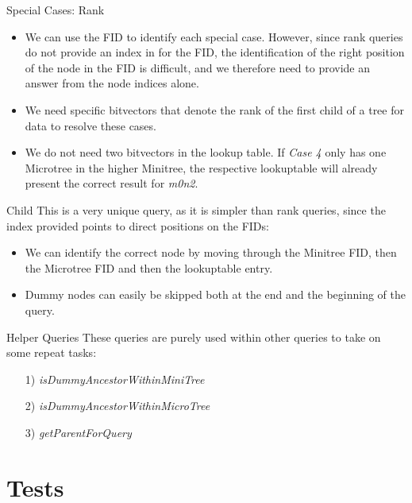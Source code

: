\documentclass{beamer}
\begin{document}
\begin{frame}{Special Cases: Rank}
	\begin{itemize}
	\item
		We can use the FID to identify each special case. However, since rank queries do not provide an index in for the FID, the identification of the right position of the node in the FID is difficult, and we therefore need to provide an answer from the node indices alone.
	\item
		We need specific bitvectors that denote the rank of the first child of a tree for data to resolve these cases.
	\item
		We do not need two bitvectors in the lookup table. If \textit{Case 4} only has one Microtree in the higher Minitree, the respective lookuptable will already present the correct result for \textit{m0n2}.
	\end{itemize}
\end{frame}

\begin{frame}{Child}
	This is a very unique query, as it is simpler than rank queries, since the index provided points to direct positions on the FIDs:
	\begin{itemize}
	\item
		We can identify the correct node by moving through the Minitree FID, then the Microtree FID and then the lookuptable entry.
	\item
		Dummy nodes can easily be skipped both at the end and the beginning of the query.
	\end{itemize}
\end{frame}

\begin{frame}{Helper Queries}
	These queries are purely used within other queries to take on some repeat tasks:
	\begin{itemize}
	\item[1)] \textit{isDummyAncestorWithinMiniTree}
	\item[2)] \textit{isDummyAncestorWithinMicroTree}
	\item[3)] \textit{getParentForQuery}
	\end{itemize}
\end{frame}

\section{Tests}
\end{document}
